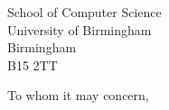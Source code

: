 \documentclass[12pt]{letter}
\begin{document}
\begin{letter}{School of Computer Science \\ University of Birmingham \\ Birmingham \\ B15 2TT}
\opening{To whom it may concern,}











\end{letter}
\end{document}
